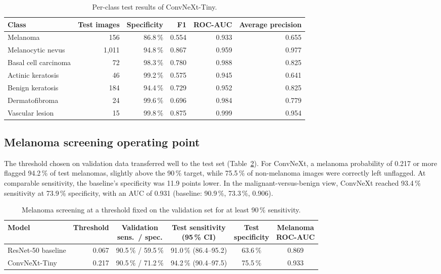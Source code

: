 \documentclass[11pt,a4paper]{article}
\newcommand{\pct}{\,\%}
\begin{document}
\begin{table}[ht]
\centering
\caption{Per-class test results of ConvNeXt-Tiny.}
\label{tab:perclass}
\small
\begin{tabular}{@{}lrrrrr@{}}
\toprule
Class & Test images & Specificity & F1 & ROC-AUC & Average precision \\
\midrule
Melanoma & 156 & 86.8\pct & 0.554 & 0.933 & 0.655 \\
Melanocytic nevus & 1,011 & 94.8\pct & 0.867 & 0.959 & 0.977 \\
Basal cell carcinoma & 72 & 98.3\pct & 0.780 & 0.988 & 0.825 \\
Actinic keratosis & 46 & 99.2\pct & 0.575 & 0.945 & 0.641 \\
Benign keratosis & 184 & 94.4\pct & 0.729 & 0.952 & 0.825 \\
Dermatofibroma & 24 & 99.6\pct & 0.696 & 0.984 & 0.779 \\
Vascular lesion & 15 & 99.8\pct & 0.875 & 0.999 & 0.954 \\
\bottomrule
\end{tabular}
\end{table}

\subsection{Melanoma screening operating point}
The threshold chosen on validation data transferred well to the test set (Table~\ref{tab:screen}). For ConvNeXt, a melanoma probability of 0.217 or more flagged 94.2\pct{} of test melanomas, slightly above the 90\pct{} target, while 75.5\pct{} of non-melanoma images were correctly left unflagged. At comparable sensitivity, the baseline's specificity was 11.9 points lower. In the malignant-versus-benign view, ConvNeXt reached 93.4\pct{} sensitivity at 73.9\pct{} specificity, with an AUC of 0.931 (baseline: 90.9\pct, 73.3\pct, 0.906).

\begin{table}[ht]
\centering
\caption{Melanoma screening at a threshold fixed on the validation set for at least 90\pct{} sensitivity.}
\label{tab:screen}
\small
\begin{tabular}{@{}lrcccc@{}}
\toprule
Model & Threshold & \makecell{Validation\\sens.\ / spec.} & \makecell{Test sensitivity\\(95\pct{} CI)} & \makecell{Test\\specificity} & \makecell{Melanoma\\ROC-AUC} \\
\midrule
ResNet-50 baseline & 0.067 & 90.5\pct{} / 59.5\pct & 91.0\pct{} (86.4--95.2) & 63.6\pct & 0.869 \\
ConvNeXt-Tiny & 0.217 & 90.5\pct{} / 71.2\pct & 94.2\pct{} (90.4--97.5) & 75.5\pct & 0.933 \\
\bottomrule
\end{tabular}
\end{table}
\end{document}
